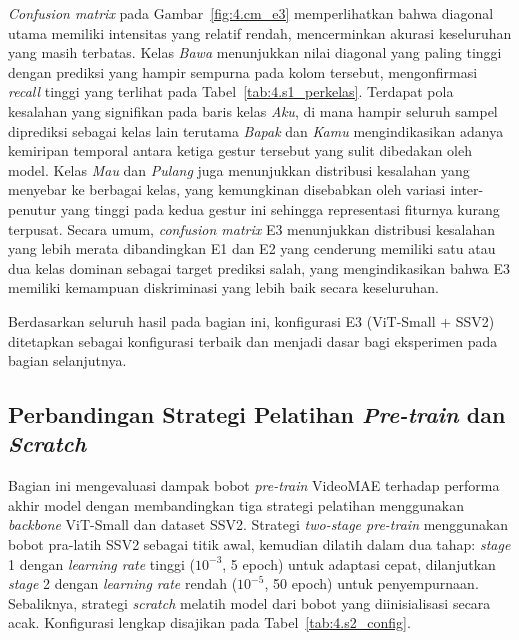 \textit{Confusion matrix} pada Gambar~\ref{fig:4.cm_e3} memperlihatkan bahwa diagonal utama memiliki intensitas yang relatif rendah, mencerminkan akurasi keseluruhan yang masih terbatas. Kelas \textit{Bawa} menunjukkan nilai diagonal yang paling tinggi dengan prediksi yang hampir sempurna pada kolom tersebut, mengonfirmasi \textit{recall} tinggi yang terlihat pada Tabel~\ref{tab:4.s1_perkelas}. Terdapat pola kesalahan yang signifikan pada baris kelas \textit{Aku}, di mana hampir seluruh sampel diprediksi sebagai kelas lain terutama \textit{Bapak} dan \textit{Kamu} mengindikasikan adanya kemiripan temporal antara ketiga gestur tersebut yang sulit dibedakan oleh model. Kelas \textit{Mau} dan \textit{Pulang} juga menunjukkan distribusi kesalahan yang menyebar ke berbagai kelas, yang kemungkinan disebabkan oleh variasi inter-penutur yang tinggi pada kedua gestur ini sehingga representasi fiturnya kurang terpusat. Secara umum, \textit{confusion matrix} E3 menunjukkan distribusi kesalahan yang lebih merata dibandingkan E1 dan E2 yang cenderung memiliki satu atau dua kelas dominan sebagai target prediksi salah, yang mengindikasikan bahwa E3 memiliki kemampuan diskriminasi yang lebih baik secara keseluruhan.\par
\par

Berdasarkan seluruh hasil pada bagian ini, konfigurasi E3 (ViT-Small + SSV2) ditetapkan sebagai konfigurasi terbaik dan menjadi dasar bagi eksperimen pada bagian selanjutnya.\par


\subsection{Perbandingan Strategi Pelatihan \textit{Pre-train} dan \textit{Scratch}} \label{IV.Sek2}

Bagian ini mengevaluasi dampak bobot \textit{pre-train} VideoMAE terhadap performa akhir model dengan membandingkan tiga strategi pelatihan menggunakan \textit{backbone} ViT-Small dan dataset SSV2. Strategi \textit{two-stage pre-train} menggunakan bobot pra-latih SSV2 sebagai titik awal, kemudian dilatih dalam dua tahap: \textit{stage} 1 dengan \textit{learning rate} tinggi ($10^{-3}$, 5 epoch) untuk adaptasi cepat, dilanjutkan \textit{stage} 2 dengan \textit{learning rate} rendah ($10^{-5}$, 50 epoch) untuk penyempurnaan. Sebaliknya, strategi \textit{scratch} melatih model dari bobot yang diinisialisasi secara acak. Konfigurasi lengkap disajikan pada Tabel~\ref{tab:4.s2_config}.\par

